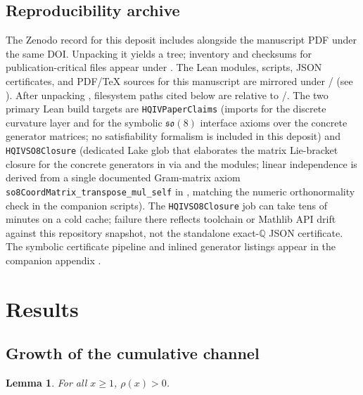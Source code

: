 \documentclass[11pt]{amsart}
\newtheorem{lemma}[theorem]{Lemma}
\begin{document}
\subsection{Reproducibility archive}\label{sec:methods-repro}
\begin{sloppypar}
The Zenodo record for this deposit includes \CompanionCodeZip{} alongside the manuscript PDF under the same DOI. Unpacking it yields a  tree; inventory and checksums for publication-critical files appear under . The Lean modules, scripts, JSON certificates, and PDF/\TeX{} sources for this manuscript are mirrored under \PaperReproBundleDir/ (see \PaperReproBundleManifest). After unpacking \CompanionCodeZip{}, filesystem paths cited below are relative to \PaperReproBundleDir/. The two primary Lean build targets are \texttt{HQIVPaperClaims} (imports  for the discrete curvature layer and  for the symbolic \(\mathfrak{so}(8)\) interface axioms over the concrete generator matrices; no satisfiability formalism is included in this deposit) and \texttt{HQIVSO8Closure} (dedicated Lake glob that elaborates the matrix Lie-bracket closure for the concrete generators in  via  and the  modules; linear independence is derived from a single documented Gram-matrix axiom \texttt{so8CoordMatrix\_transpose\_mul\_self} in , matching the numeric orthonormality check in the companion scripts). The \texttt{HQIVSO8Closure} job can take tens of minutes on a cold cache; failure there reflects toolchain or Mathlib API drift against this repository snapshot, not the standalone exact-\(\mathbb{Q}\) JSON certificate. The symbolic certificate pipeline and inlined generator listings appear in the companion appendix \cite{so8-appendix}.
\end{sloppypar}

\section{Results}\label{sec:results}

\subsection{Growth of the cumulative channel}\label{sec:results-channel}

\begin{lemma}
For all \(x\ge1\), \(\rho(x)>0\).
\end{lemma}
\end{document}
